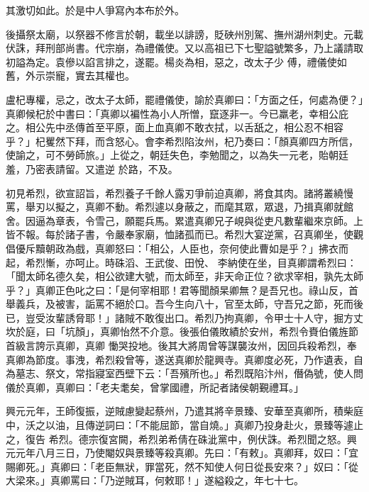 \begin{pinyinscope}
 其激切如此。於是中人爭寫內本布於外。



 後攝祭太廟，以祭器不修言於朝，載坐以誹謗，貶硤州別駕、撫州湖州刺史。元載伏誅，拜刑部尚書。代宗崩，為禮儀使。又以高祖已下七聖謚號繁多，乃上議請取初謚為定。袁傪以諂言排之，遂罷。楊炎為相，惡之，改太子少
 傅，禮儀使如舊，外示崇寵，實去其權也。



 盧杞專權，忌之，改太子太師，罷禮儀使，諭於真卿曰：「方面之任，何處為便？」真卿候杞於中書曰：「真卿以褊性為小人所憎，竄逐非一。今已羸老，幸相公庇之。相公先中丞傳首至平原，面上血真卿不敢衣拭，以舌舐之，相公忍不相容乎？」杞矍然下拜，而含怒心。會李希烈陷汝州，杞乃奏曰：「顏真卿四方所信，使諭之，可不勞師旅。」上從之，朝廷失色，李勉聞之，以為失一元老，貽朝廷羞，乃密表請留。又遣逆
 於路，不及。



 初見希烈，欲宣詔旨，希烈養子千餘人露刃爭前迫真卿，將食其肉。諸將叢繞慢罵，舉刃以擬之，真卿不動。希烈遽以身蔽之，而麾其眾，眾退，乃揖真卿就館舍。因逼為章表，令雪己，願罷兵馬。累遣真卿兄子峴與從吏凡數輩繼來京師。上皆不報。每於諸子書，令嚴奉家廟，恤諸孤而已。希烈大宴逆黨，召真卿坐，使觀倡優斥黷朝政為戲，真卿怒曰：「相公，人臣也，奈何使此曹如是乎？」拂衣而起，希烈慚，亦呵止。時硃滔、王武俊、田悅、
 李納使在坐，目真卿謂希烈曰：「聞太師名德久矣，相公欲建大號，而太師至，非天命正位？欲求宰相，孰先太師乎？」真卿正色叱之曰：「是何宰相耶！君等聞顏杲卿無？是吾兄也。祿山反，首舉義兵，及被害，詬罵不絕於口。吾今生向八十，官至太師，守吾兄之節，死而後已，豈受汝輩誘脅耶！」諸賊不敢復出口。希烈乃拘真卿，令甲士十人守，掘方丈坎於庭，曰「坑顏」，真卿怡然不介意。後張伯儀敗績於安州，希烈令賚伯儀旌節首級言誇示真卿，真卿
 慟哭投地。後其大將周曾等謀襲汝州，因回兵殺希烈，奉真卿為節度。事洩，希烈殺曾等，遂送真卿於龍興寺。真卿度必死，乃作遺表，自為墓志、祭文，常指寢室西壁下云：「吾殯所也。」希烈既陷汴州，僭偽號，使人問儀於真卿，真卿曰：「老夫耄矣，曾掌國禮，所記者諸侯朝覲禮耳。」



 興元元年，王師復振，逆賊慮變起蔡州，乃遣其將辛景臻、安華至真卿所，積柴庭中，沃之以油，且傳逆詞曰：「不能屈節，當自燒。」真卿乃投身赴火，景臻等遽止之，復告
 希烈。德宗復宮闕，希烈弟希倩在硃泚黨中，例伏誅。希烈聞之怒。興元元年八月三日，乃使閹奴與景臻等殺真卿。先曰：「有敕」。真卿拜，奴曰：「宜賜卿死。」真卿曰：「老臣無狀，罪當死，然不知使人何日從長安來？」奴曰：「從大梁來。」真卿罵曰：「乃逆賊耳，何敕耶！」遂縊殺之，年七十七。




\end{pinyinscope}
